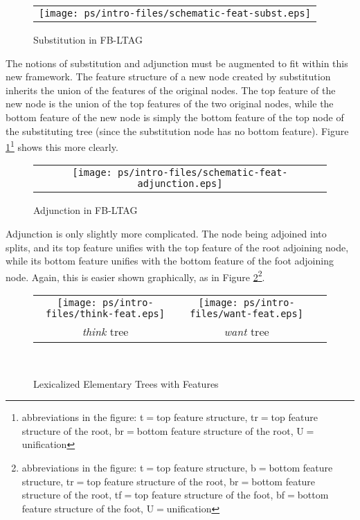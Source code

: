 \begin{figure}[htb]
\centering
\begin{tabular}{c}
\texttt{[image: ps/intro-files/schematic-feat-subst.eps]}
\end{tabular}
\caption{Substitution in FB-LTAG}
\label{subst-fig}
\end{figure}

The notions of substitution and adjunction must be augmented to fit
within this new framework.  The feature structure of a new node
created by substitution inherits the union of the features of the
original nodes.  The top feature of the new node is the union of the
top features of the two original nodes, while the bottom feature of
the new node is simply the bottom feature of the top node of the
substituting tree (since the substitution node has no bottom feature).
Figure \ref{subst-fig}\footnote{abbreviations in the figure:
t$=$top feature structure, tr$=$top feature structure of the root, br$=$bottom
feature structure of the root, U$=$unification} shows this more
clearly.

\begin{figure}[htb]
\centering
\begin{tabular}{c}
\hspace{0.65in}
\texttt{[image: ps/intro-files/schematic-feat-adjunction.eps]}
\end{tabular}
\caption{Adjunction in FB-LTAG}
\label{adjunct-fig}
\end{figure}

Adjunction is only slightly more complicated.  The node being adjoined into
splits, and its top feature unifies with the top feature of the root
adjoining node, while its bottom feature unifies with the bottom feature of the
foot adjoining node.  Again, this is easier shown graphically, as in Figure
\ref{adjunct-fig}\footnote{abbreviations in the figure: t$=$top
feature structure, b$=$bottom feature structure, tr$=$top feature
structure of the root, br$=$bottom feature structure of the root,
tf$=$top feature structure of the foot, bf$=$bottom feature structure
of the foot, U$=$unification}.

\begin{figure}[htbp]
\centering
\begin{tabular}{ccc}
\texttt{[image: ps/intro-files/think-feat.eps]}  &
\hspace{0.6in}
\texttt{[image: ps/intro-files/want-feat.eps]} \\
{\it think} tree&{\it want} tree\\
\end{tabular}\\
\caption {Lexicalized Elementary Trees with Features}
\label {lex-with-features}
\label{2;Tnx0Vs1}
\end{figure}


